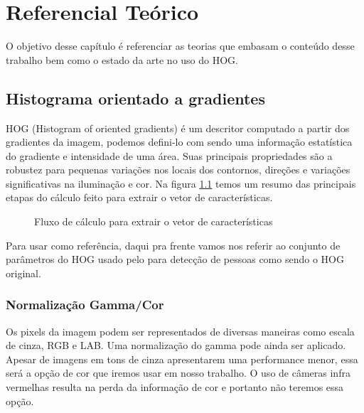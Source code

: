 \chapter{Referencial Teórico}

O objetivo desse capítulo é referenciar as teorias que embasam o conteúdo desse trabalho bem como o estado da arte no uso do HOG.

\section{Histograma orientado a gradientes}
\label{sec:HOG}

HOG (Histogram of oriented gradients) é um descritor computado a partir dos gradientes da imagem, podemos defini-lo com sendo uma informação estatística do gradiente e intensidade de uma área. Suas principais propriedades são a robustez para pequenas variações nos locais dos contornos, direções e variações significativas na iluminação e cor. Na figura \ref{fig:hog} temos um resumo das principais etapas do cálculo feito para extrair o vetor de características.

\begin{figure}[ht!]
\centering
{}
  \caption{Fluxo de cálculo para extrair o vetor de características}
  \label{fig:hog}
\end{figure}

Para usar como referência, daqui pra frente vamos nos referir ao conjunto de parâmetros do HOG usado pelo  para detecção de pessoas como sendo o HOG original.

\subsection{Normalização Gamma/Cor}

Os pixels da imagem podem ser representados de diversas maneiras como escala de cinza, RGB e LAB. Uma normalização do gamma pode ainda ser aplicado. 
Apesar de imagens em tons de cinza apresentarem uma performance menor, essa será a opção de cor que iremos usar em nosso trabalho. O uso de câmeras infra vermelhas resulta na perda da informação de cor e portanto não teremos essa opção.

